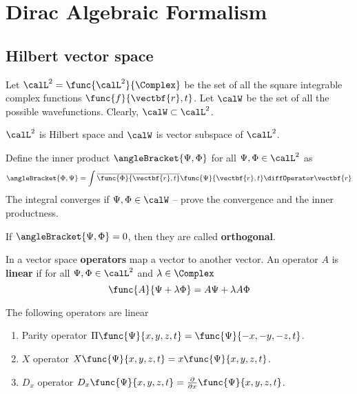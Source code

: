 \chapter{Dirac Algebraic Formalism}
\section{Hilbert vector space}
Let \(\calL^2 = \func{\calL^2}{\Complex}\) be the set of all the square integrable complex functions \(\func{f}{\vectbf{r},t}\). Let \(\calW\) be the set of all the possible wavefunctions. Clearly, \(\calW \subset \calL^2\).
\begin{proposition}
    \(\calL^2\) is Hilbert space and \(\calW\) is vector subspace of \(\calL^2\).
\end{proposition}
\begin{definition}
    Define the inner product \(\angleBracket{\Psi,\Phi}\) for all \(\Psi, \Phi \in \calL^2\) as
    \begin{equation*}
        \angleBracket{\Phi,\Psi} = \int \overline{\func{\Phi}{\vectbf{r},t}} \func{\Psi}{\vectbf{r},t} \diffOperator \vectbf{r}
    \end{equation*}
    The integral converges if \(\Psi,\Phi \in \calW\) -- prove the convergence and the inner productness.

    If \(\angleBracket{\Psi,\Phi} = 0\), then they are called \textbf{orthogonal}.
\end{definition}

In a vector space \textbf{operators} map a vector to another vector. An operator \(A\) is \textbf{linear} if for all \(\Psi,\Phi \in \calL^2\) and \(\lambda \in \Complex\)
\begin{equation*}
    \func{A}{\Psi + \lambda \Phi} = A \Psi + \lambda A \Phi
\end{equation*}

\begin{example}
    The following operators are linear
    \begin{enumerate}
        \item Parity operator \(\Pi \func{\Psi}{x,y,z,t} = \func{\Psi}{-x,-y,-z,t}\).
        \item \(X\) operator \(X \func{\Psi}{x,y,z,t} = x \func{\Psi}{x,y,z,t}\).
        \item \(D_x\) operator \(D_x \func{\Psi}{x,y,z,t} = \frac{\partial}{\partial x} \func{\Psi}{x,y,z,t}\).
    \end{enumerate}
\end{example}

